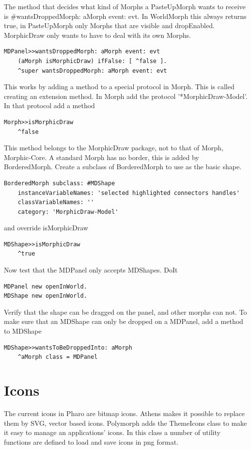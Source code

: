 \documentclass[10pt, twoside]{article}   	%
\begin{document}
The method that decides what kind of Morphs a PasteUpMorph wants 
to receive is \#wantsDroppedMorph: aMorph event: evt. In WorldMorph this
always returns true, in PasteUpMorph only Morphs that are visible and
dropEnabled. MorphicDraw only wants to have to deal with its own 
Morphs. 
\begin{verbatim}
MDPanel>>wantsDroppedMorph: aMorph event: evt
    (aMorph isMorphicDraw) ifFalse: [ ^false ].
    ^super wantsDroppedMorph: aMorph event: evt
\end{verbatim}
This works by adding a method to a special protocol in Morph.
This is called creating an extension method.
In Morph add the protocol '*MorphicDraw-Model'.
In that protocol add a method
\begin{verbatim}
Morph>>isMorphicDraw
    ^false
\end{verbatim}
This method belongs to the MorphicDraw package, not to 
that of Morph, Morphic-Core.
A standard Morph has no border, this is added by BorderedMorph.
Create a subclass of BorderedMorph to use as the basic shape.
\begin{verbatim}
BorderedMorph subclass: #MDShape
    instanceVariableNames: 'selected highlighted connectors handles'
    classVariableNames: ''
    category: 'MorphicDraw-Model'
\end{verbatim}
and override isMorphicDraw
\begin{verbatim}
MDShape>>isMorphicDraw
    ^true
\end{verbatim}
Now test that the MDPanel only accepts MDShapes. 
DoIt
\begin{verbatim}
MDPanel new openInWorld.
MDShape new openInWorld.
\end{verbatim}
Verify that the shape can be dragged on the panel, and other morphs can not.
To make sure that an MDShape can only be dropped on a MDPanel,
add a method to MDShape
\begin{verbatim}
MDShape>>wantsToBeDroppedInto: aMorph
    ^aMorph class = MDPanel
\end{verbatim}

\section{Icons\label{Icons}}
The current icons in Pharo are bitmap icons. Athens makes it possible
to replace them by SVG, vector based icons. Polymorph adds the 
ThemeIcons class to make it easy to manage an applications' icons.
In this class a number of utility functions are defined to load and save
icons in png format. 
\end{document}
